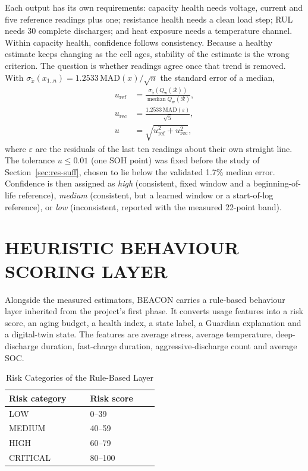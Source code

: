 \documentclass[12pt,a4paper]{amritareport}
\newcommand{\Qw}{Q_{\mathrm{w}}}
\begin{document}
Each output has its own requirements: capacity health needs voltage, current and five reference readings plus one; resistance health needs a clean load step; RUL needs 30 complete discharges; and heat exposure needs a temperature channel. Within capacity health, confidence follows consistency. Because a healthy estimate keeps changing as the cell ages, stability of the estimate is the wrong criterion. The question is whether readings agree once that trend is removed. With $\sigma_{\tilde x}(x_{1..n}) = 1.2533\,\mathrm{MAD}(x)/\sqrt{n}$ the standard error of a median,
\begin{align}
u_\mathrm{ref} &= \frac{\sigma_{\tilde x}\!\left(\Qw(\mathcal{R})\right)}{\operatorname{median}\Qw(\mathcal{R})}, \\
u_\mathrm{rec} &= \frac{1.2533\,\mathrm{MAD}(\varepsilon)}{\sqrt{5}}, \\
u &= \sqrt{u_\mathrm{ref}^2 + u_\mathrm{rec}^2},
\label{eq:u}
\end{align}
where $\varepsilon$ are the residuals of the last ten readings about their own straight line. The tolerance $u \le 0.01$ (one SOH point) was fixed before the study of Section~\ref{sec:res-suff}, chosen to lie below the validated 1.7\% median error. Confidence is then assigned as \emph{high} (consistent, fixed window and a beginning-of-life reference), \emph{medium} (consistent, but a learned window or a start-of-log reference), or \emph{low} (inconsistent, reported with the measured 22-point band).

\section{HEURISTIC BEHAVIOUR SCORING LAYER}
\label{sec:behaviour}

Alongside the measured estimators, BEACON carries a rule-based behaviour layer inherited from the project's first phase. It converts usage features into a risk score, an aging budget, a health index, a state label, a Guardian explanation and a digital-twin state. The features are average stress, average temperature, deep-discharge duration, fast-charge duration, aggressive-discharge count and average SOC.

\begin{table}[htbp]
	\caption{Risk Categories of the Rule-Based Layer}
	\centering
	\small
	\renewcommand{\arraystretch}{1.15}
	\setlength{\tabcolsep}{4pt}
	\begin{tabular}{|C{0.25\linewidth}|C{0.25\linewidth}|}
		\hline
		\textbf{Risk category} & \textbf{Risk score} \\
		\hline
		LOW & 0--39 \\
		\hline
		MEDIUM & 40--59 \\
		\hline
		HIGH & 60--79 \\
		\hline
		CRITICAL & 80--100 \\
		\hline
	\end{tabular}
	\label{tab:risk}
\end{table}
\end{document}
